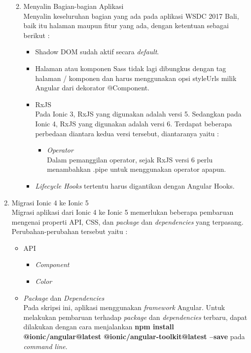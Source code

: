 \begin{enumerate}
\begin{enumerate}
\begin{itemize}
			
		\end{itemize}
		\newpage
		\item Menyalin Bagian-bagian Aplikasi \\
		Menyalin keseluruhan bagian yang ada pada aplikasi WSDC 2017 Bali, baik itu halaman maupun fitur yang ada, dengan ketentuan sebagai berikut :
		\begin{itemize}
			\item Shadow DOM sudah aktif secara {\it default}.
			\item Halaman atau komponen Sass tidak lagi dibungkus dengan tag halaman / komponen dan harus menggunakan opsi styleUrls milik Angular dari dekorator @Component.
			\item RxJS \\
			Pada Ionic 3, RxJS yang digunakan adalah versi 5. Sedangkan pada Ionic 4, RxJS yang digunakan adalah versi 6. Terdapat beberapa perbedaan diantara kedua versi tersebut, diantaranya yaitu :
			\begin{itemize}
				\item {\it Operator} \\
				Dalam pemanggilan operator, sejak RxJS versi 6 perlu menambahkan .pipe untuk menggunakan operator apapun.
			\end{itemize}
			\item {\it Lifecycle Hooks} tertentu harus digantikan dengan Angular Hooks.
		\end{itemize}
	\end{enumerate}
	\item Migrasi Ionic 4 ke Ionic 5 \\
	Migrasi aplikasi dari Ionic 4 ke Ionic 5 memerlukan beberapa pembaruan mengenai properti API, CSS, dan {\it package} dan {\it dependencies} yang terpasang. Perubahan-perubahan tersebut yaitu :
	\begin{itemize}
		\item API
		\begin{itemize}
			\item {\it Component}
			\item {\it Color}
			
		\end{itemize}
		
		\item {\it Package} dan {\it Dependencies} \\
		Pada skripsi ini, aplikasi menggunakan {\it framework} Angular. Untuk melakukan pembaruan terhadap {\it package} dan {\it dependencies} terbaru, dapat dilakukan dengan cara menjalankan \textbf{npm install @ionic/angular@latest @ionic/angular-toolkit@latest --save} pada {\it command line}.
	\end{itemize}
\end{enumerate}

